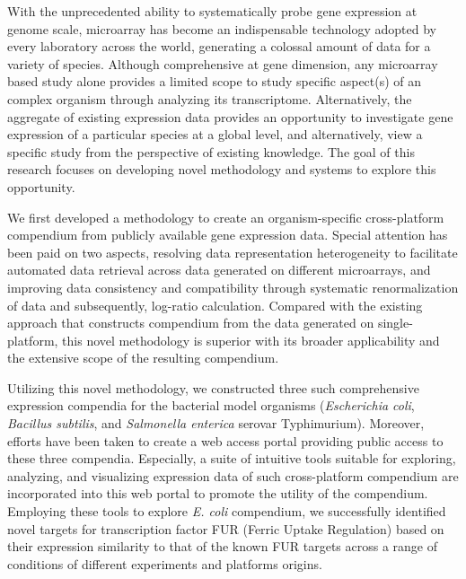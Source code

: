 With the unprecedented ability to systematically probe gene expression
at genome scale, microarray has become an indispensable technology
adopted by every laboratory across the world, generating a colossal
amount of data for a variety of species.
%
Although comprehensive at gene dimension, any microarray based study
alone provides a limited scope to study specific aspect(s) of an
complex organism through analyzing its transcriptome.
%
Alternatively, the aggregate of existing expression data provides an
opportunity to investigate gene expression of a particular species at
a global level, and alternatively, view a specific study from the
perspective of existing knowledge.
%
The goal of this research focuses on developing novel methodology and
systems to explore this opportunity.
%



We first developed a methodology to create an organism-specific
cross-platform compendium from publicly available gene expression data.
%
Special attention has been paid on two aspects, resolving data
representation heterogeneity to facilitate automated data retrieval
across data generated on different microarrays, and improving data
consistency and compatibility through systematic renormalization of data
and subsequently, log-ratio calculation.
%
%
Compared with the existing approach that constructs compendium from
the data generated on single-platform, this novel methodology is
superior with its broader applicability and the extensive scope of the
resulting compendium.


Utilizing this novel methodology, we constructed three such
comprehensive expression compendia for the bacterial model organisms
(\textit{Escherichia coli}, \textit{Bacillus subtilis}, and
\textit{Salmonella enterica} serovar Typhimurium).
%
Moreover, efforts have been taken to create a web access portal
providing public access to these three compendia.
%
Especially, a suite of intuitive tools suitable for exploring,
analyzing, and visualizing expression data of such cross-platform
compendium are incorporated into this web portal to promote the utility
of the compendium.
%
Employing these tools to explore \textit{E. coli} compendium, we
successfully identified novel targets for transcription factor FUR
(Ferric Uptake Regulation) based on their expression similarity to that
of the known FUR targets across a range of conditions of different
experiments and platforms origins.
%


